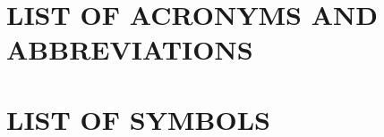 \documentclass[12pt]{report}
\begin{document}
{

\chapter*{\fontb LIST OF ACRONYMS AND ABBREVIATIONS}



\chapter*{\fontb LIST OF SYMBOLS}



\clearpage

\renewcommand{\listtablename}{\vspace{-2.3cm}\hfill\fonta{16} LIST OF TABLES
\hfill} %
\renewcommand{\cftafterlottitle}{
	\\[\baselineskip]\mbox{}\hfill{\textbf{\fonta{12} Page No.}}}
\renewcommand{\cftdot}{} %
\renewcommand{\cfttabpresnum}{\bfseries{\fonta{12} Table }}
\renewcommand{\cfttabaftersnum}{\textbf{ :}}
\setlength{\cfttabnumwidth}{2cm} %
\renewcommand{\cfttabfont}{\fonta{12}} %
\listoftables %

\clearpage

\renewcommand{\listfigurename}{\vspace{-2.3cm}\hfill\fonta{16} LIST OF FIGURES
\hfill} %
\renewcommand{\cftafterloftitle}{
	\\[\baselineskip]\mbox{}\hfill{\textbf{\fonta{12} Page No.}}}
\renewcommand{\cftfigpresnum}{\bfseries{\fonta{12} Figure }}
\renewcommand{\cftfigaftersnum}{\textbf{ :}}
\setlength{\cftfignumwidth}{2.5cm} %
\renewcommand{\cftfigfont}{\fonta{12}} %
\listoffigures %

\clearpage

\renewcommand{\cftbeforetoctitleskip}{0cm}
\renewcommand{\contentsname}{\vspace{-0.5cm}\hfill\fonta{16} TABLE OF CONTENTS
\hfill} %
\renewcommand{\cftaftertoctitle}{
	\\[\baselineskip]\mbox{}\hfill{\textbf{\fonta{12} Page No.}}}
\renewcommand{\cftchapindent}{0.6cm} %
\tableofcontents %

}
\end{document}
